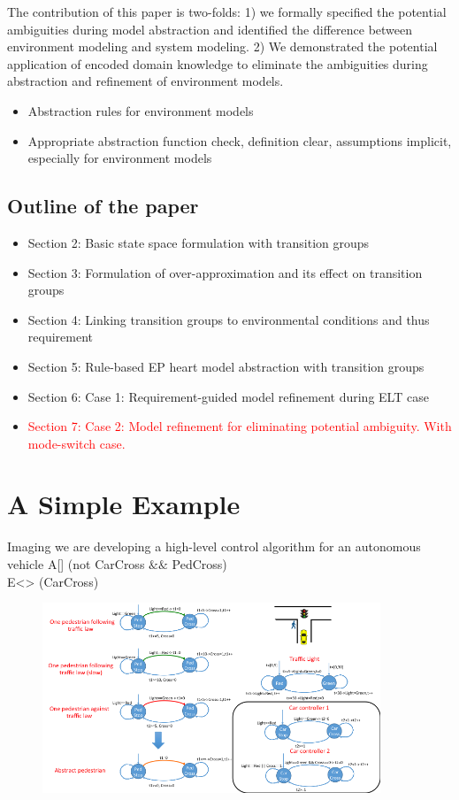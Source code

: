 \documentclass{llncs}
\begin{document}
The contribution of this paper is two-folds: 1) we formally specified the potential ambiguities during model abstraction and identified the difference between environment modeling and system modeling. 2) We demonstrated the potential application of encoded domain knowledge to eliminate the ambiguities during abstraction and refinement of environment models.
\begin{itemize}
	\item Abstraction rules for environment models 
    \item Appropriate abstraction function check, definition clear, assumptions implicit, especially for environment models
\end{itemize}



\subsection{Outline of the paper}
\begin{itemize}
	\item Section 2: Basic state space formulation with transition groups
    \item Section 3: Formulation of over-approximation and its effect on transition groups
    \item Section 4: Linking transition groups to environmental conditions and thus requirement
    \item Section 5: Rule-based EP heart model abstraction with transition groups
    \item Section 6: Case 1: Requirement-guided model refinement during ELT case 
    \item\textcolor{red}{ Section 7: Case 2: Model refinement for eliminating potential ambiguity. With mode-switch case.} 
\end{itemize}

\section{A Simple Example}
Imaging we are developing a high-level control algorithm for an autonomous vehicle
\textsf{A[] (not CarCross $\&\&$ PedCross)}\\
\textsf{E<> (CarCross)}
\begin{figure}[!t]
		\centering
		\includegraphics[width=0.9\textwidth]{figs/example.png}
		\caption{\small }
		\label{fig:example}
\end{figure}
\end{document}
